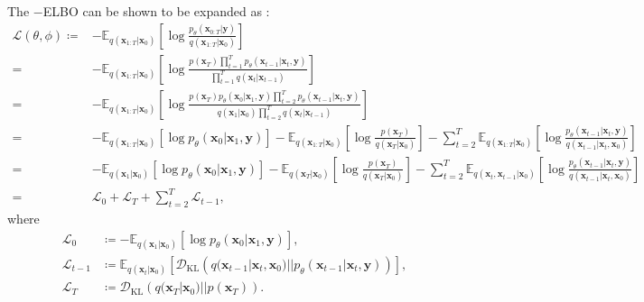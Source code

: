 The $-$ELBO can be shown to be expanded as \citep{luo2022understanding,sohl2015deep,ho2020denoising}:
\begin{equation}
\begin{aligned}
    \mathcal{L}(\theta,\phi)\coloneq&-\mathbb{E}_{q(\mathbf{x}_{1:T}|\mathbf{x}_0)}\left[\log\frac{p_\theta({\mathbf{x}_{0:T}}|\mathbf{y})}{q(\mathbf{x}_{1:T}|\mathbf{x}_0)}\right] \\
    =&-\mathbb{E}_{q(\mathbf{x}_{1:T}|\mathbf{x}_0)}\left[\log\frac{p(\mathbf{x}_T)\prod_{t=1}^Tp_\theta(\mathbf{x}_{t-1}|\mathbf{x}_t,\mathbf{y})}{\prod_{t=1}^T q(\mathbf{x}_t|\mathbf{x}_{t-1})}\right] \\
    =&-\mathbb{E}_{q(\mathbf{x}_{1:T}|\mathbf{x}_0)}\left[\log\frac{p(\mathbf{x}_T)p_\theta(\mathbf{x}_0|\mathbf{x}_1,\mathbf{y})\prod_{t=2}^T p_\theta(\mathbf{x}_{t-1}|\mathbf{x}_t,\mathbf{y})}{q(\mathbf{x}_1|\mathbf{x}_0)\prod_{t=2}^T q(\mathbf{x}_t|\mathbf{x}_{t-1})}\right] \\
    =&-\mathbb{E}_{q(\mathbf{x}_{1:T}|\mathbf{x}_0)}\left[\log p_\theta(\mathbf{x}_0|\mathbf{x}_1,\mathbf{y})\right] -\mathbb{E}_{q(\mathbf{x}_{1:T}|\mathbf{x}_0)}\left[\log\frac{p(\mathbf{x}_T)}{q(\mathbf{x}_T|\mathbf{x}_0)}\right] 
    -\sum_{t=2}^T\mathbb{E}_{q(\mathbf{x}_{1:T}|\mathbf{x}_0)}\left[\log\frac{p_\theta(\mathbf{x}_{t-1}|\mathbf{x}_t,\mathbf{y})}{q(\mathbf{x}_{t-1}|\mathbf{x}_t,\mathbf{x}_0)}\right] \\
    =&-\mathbb{E}_{q(\mathbf{x}_1|\mathbf{x}_0)}\left[\log p_\theta(\mathbf{x}_0|\mathbf{x}_1,\mathbf{y})\right] -\mathbb{E}_{q(\mathbf{x}_T|\mathbf{x}_0)}\left[\log\frac{p(\mathbf{x}_T)}{q(\mathbf{x}_T|\mathbf{x}_0)}\right] 
    -\sum_{t=2}^T\mathbb{E}_{q(\mathbf{x}_t,\mathbf{x}_{t-1}|\mathbf{x}_0)}\left[\log\frac{p_\theta(\mathbf{x}_{t-1}|\mathbf{x}_t,\mathbf{y})}{q(\mathbf{x}_{t-1}|\mathbf{x}_t,\mathbf{x}_0)}\right] \\
    =&\mathcal{L}_0+\mathcal{L}_T+\sum_{t=2}^T\mathcal{L}_{t-1},
\label{eq: ddpm elbo appendix}
\end{aligned}
\end{equation}
where
\begin{align}
    \mathcal{L}_0&\coloneq -\mathbb{E}_{q(\mathbf{x}_1|\mathbf{x}_0)}\left[\log p_\theta(\mathbf{x}_0|\mathbf{x}_1,\mathbf{y})\right], \\
    \mathcal{L}_{t-1}&\coloneq \mathbb{E}_{q(\mathbf{x}_t|\mathbf{x}_0)}\left[\mathcal{D}_{\text{KL}}\left(q(\mathbf{x}_{t-1}|\mathbf{x}_t,\mathbf{x}_0)||p_\theta(\mathbf{x}_{t-1}|\mathbf{x}_t,\mathbf{y})\right)\right], \\    
    \mathcal{L}_T&\coloneq \mathcal{D}_{\text{KL}}\left(q(\mathbf{x}_T|\mathbf{x}_0)||p(\mathbf{x}_T)\right).
\label{eq: ddpm elbo appendix next}
\end{align}

